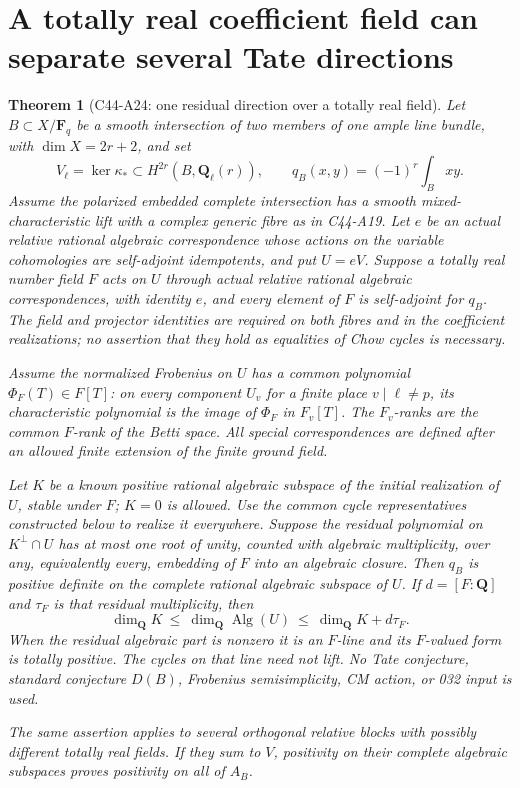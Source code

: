 \documentclass[11pt]{article}
\newtheorem{theorem}{Theorem}[section]
\theoremstyle{remark}\newtheorem{remark}[theorem]{Remark}
\begin{document}

\section{A totally real coefficient field can separate several Tate directions}
\label{sec:c44-a24}

\begin{theorem}[C44-A24: one residual direction over a totally real field]
Let $B\subset X/\mathbf F_q$ be a smooth intersection of two members of
one ample line bundle, with $\dim X=2r+2$, and set
\[
 V_\ell=\ker\kappa_*\subset H^{2r}(B,\mathbf Q_\ell(r)),\qquad
 q_B(x,y)=(-1)^r\int_Bxy.
 \tag{A24.1}
\]
Assume the polarized embedded complete intersection has a smooth
mixed-characteristic lift with a complex generic fibre as in C44-A19.
Let $e$ be an actual relative rational algebraic correspondence whose
actions on the variable cohomologies are self-adjoint idempotents, and
put $U=eV$.  Suppose a totally real number field $F$ acts on $U$ through
actual relative rational algebraic correspondences, with identity $e$,
and every element of $F$ is self-adjoint for $q_B$.  The field and
projector identities are required on both fibres and in the coefficient
realizations; no assertion that they hold as equalities of Chow cycles
is necessary.

Assume the normalized Frobenius on $U$ has a common polynomial
$\Phi_F(T)\in F[T]$: on every component $U_v$ for a finite place
$v\mid\ell\ne p$, its characteristic polynomial is the image of
$\Phi_F$ in $F_v[T]$.  The $F_v$-ranks are the common $F$-rank of the
Betti space.  All special correspondences are defined after an allowed
finite extension of the finite ground field.

Let $K$ be a known positive rational algebraic subspace of the initial
realization of $U$, stable under $F$; $K=0$ is allowed.  Use the common
cycle representatives constructed below to realize it everywhere.
Suppose the residual polynomial on $K^\perp\cap U$ has at most one
root of unity, counted with algebraic multiplicity, over any, equivalently
every, embedding of $F$ into an algebraic closure.  Then $q_B$ is
positive definite on the complete rational algebraic subspace of $U$.
If $d=[F:\mathbf Q]$ and $\tau_F$ is that residual multiplicity, then
\[
 \dim_{\mathbf Q}K\ \leq\
 \dim_{\mathbf Q}\operatorname{Alg}(U)
       \ \leq\ \dim_{\mathbf Q}K+d\tau_F.
 \tag{A24.2}
\]
When the residual algebraic part is nonzero it is an $F$-line and its
$F$-valued form is totally positive.  The cycles on that line need not
lift.  No Tate conjecture, standard conjecture $D(B)$, Frobenius
semisimplicity, CM action, or 032 input is used.

The same assertion applies to several orthogonal relative blocks with
possibly different totally real fields.  If they sum to $V$, positivity
on their complete algebraic subspaces proves positivity on all of $A_B$.
\end{theorem}
\end{document}

